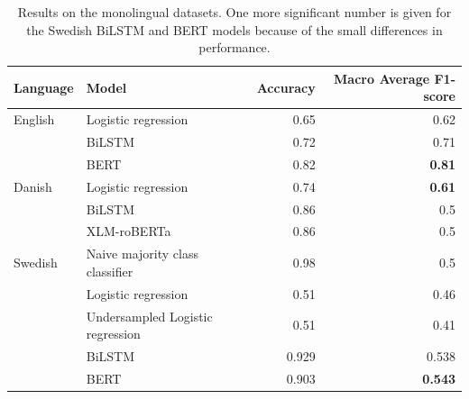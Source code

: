 \documentclass[nofilelist]{cslthse-msc}
\begin{document}
\begin{table}[t]
\centering
\begin{tabular}{@{}llrr@{}}
\toprule
Language & Model    & Accuracy & Macro Average F1-score  \\ \midrule
English & Logistic regression & 0.65 & 0.62     \\
& BiLSTM      & 0.72 & 0.71     \\
& BERT       & 0.82 & \textbf{0.81}     \\
Danish & Logistic regression & 0.74 & \textbf{0.61}     \\
& BiLSTM      & 0.86 & 0.5     \\
& XLM-roBERTa       & 0.86 & 0.5 \\
Swedish & Naive majority class classifier & 0.98 & 0.5 \\
& Logistic regression & 0.51 & 0.46     \\
& Undersampled Logistic regression & 0.51 & 0.41     \\
& BiLSTM & 0.929 & 0.538     \\
& BERT       & 0.903 & \textbf{0.543}\\
\bottomrule
\end{tabular}
\caption{Results on the monolingual datasets. One more significant number is given for the Swedish BiLSTM and BERT models because of the small differences in performance.}
\label{tab:monolingual}
\end{table}
\end{document}
